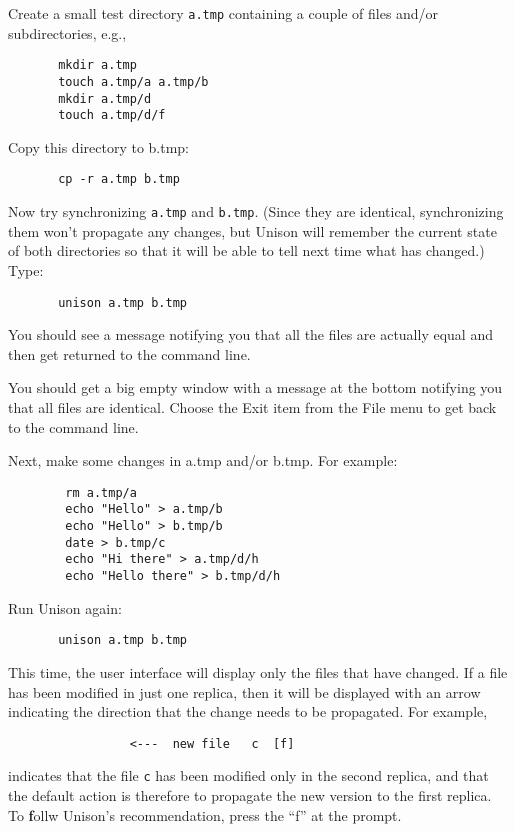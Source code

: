 \documentclass{article}
\begin{document}
Create a small test directory {\tt a.tmp} containing a couple of files
and/or subdirectories, e.g.,
\begin{verbatim}
       mkdir a.tmp
       touch a.tmp/a a.tmp/b
       mkdir a.tmp/d
       touch a.tmp/d/f
\end{verbatim}
Copy this directory to b.tmp:
\begin{verbatim}
       cp -r a.tmp b.tmp
\end{verbatim}

Now try synchronizing {\tt a.tmp} and {\tt b.tmp}.  (Since they are
identical, synchronizing them won't propagate any changes, but Unison
will remember the current state of both directories so that it will be
able to tell next time what has changed.)  Type:
\begin{verbatim}
       unison a.tmp b.tmp
\end{verbatim}

\begin{textui}
You should see a message notifying you that all the files are actually
equal and then get returned to the command line.
\end{textui}

\begin{tkui}
You should get a big empty window with a message at the bottom
notifying you that all files are identical.  Choose the Exit item from
the File menu to get back to the command line.
\end{tkui}

Next, make some changes in a.tmp and/or b.tmp.  For example:
\begin{verbatim}
        rm a.tmp/a
        echo "Hello" > a.tmp/b
        echo "Hello" > b.tmp/b
        date > b.tmp/c
        echo "Hi there" > a.tmp/d/h
        echo "Hello there" > b.tmp/d/h
\end{verbatim}
Run Unison again:
\begin{verbatim}
       unison a.tmp b.tmp
\end{verbatim}

This time, the user interface will display only the files that have
changed.  If a file has been modified in just one
replica, then it will be displayed with an arrow indicating the
direction that the change needs to be propagated.  For example, 
\begin{verbatim}
                 <---  new file   c  [f]
\end{verbatim}
\noindent
indicates that the file {\tt c} has been modified only in the second
replica, and that the default action is therefore to propagate the new
version to the first replica.  To {\bf f}ollw Unison's recommendation,
press the ``f'' at the prompt.
\end{document}
